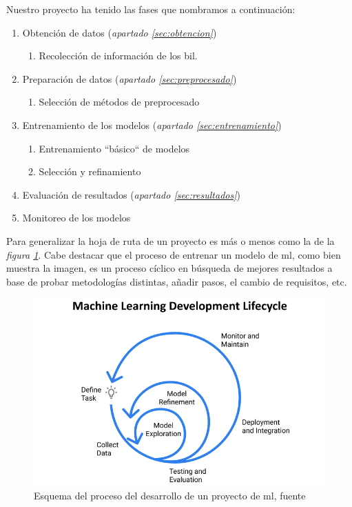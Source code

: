 Nuestro proyecto ha tenido las fases que nombramos a continuación:

\begin{enumerate}
    \item Obtención de datos (\textit{apartado \ref{sec:obtencion}})
        \begin{enumerate}
            \item Recolección de información de los \acrshort{bil}.
        \end{enumerate}
    \item Preparación de datos (\textit{apartado \ref{sec:preprocesado}})
        \begin{enumerate}
            \item Selección de métodos de preprocesado
        \end{enumerate}
    \item Entrenamiento de los modelos (\textit{apartado \ref{sec:entrenamiento}})
        \begin{enumerate}
            \item Entrenamiento ``básico`` de modelos
            \item Selección y refinamiento
        \end{enumerate}
    \item Evaluación de resultados (\textit{apartado \ref{sec:resultados}})
        
    \item Monitoreo de los modelos
\end{enumerate}

Para generalizar la hoja de ruta de un proyecto es más o menos como la de la \textit{figura \ref{fig:ml-development-cycle}}. Cabe destacar que el proceso de entrenar un modelo de \gls{ml}, como bien muestra la imagen, es un proceso cíclico en búsqueda de mejores resultados a base de probar metodologías distintas, añadir pasos, el cambio de requisitos, etc.

\begin{figure}[!htb]
    \centering
    \includegraphics[width=\linewidth]{media/images/ml-development-cycle.png}
    \caption{Esquema del proceso del desarrollo de un proyecto de \gls{ml}, fuente \cite{Organizi22:online}}
    \label{fig:ml-development-cycle}
\end{figure}


